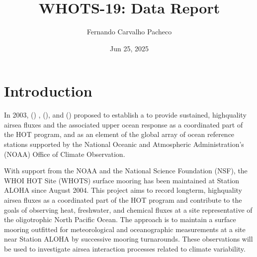 \documentclass[a4paper,10pt,english,openany,oneside]{sphinxmanual}
\title{WHOTS-19: Data Report}
\date{Jun 25, 2025}
\author{Fernando Carvalho Pacheco}
\begin{document}
\pagestyle{empty}
 
        
    
\pagestyle{plain}
 
\pagestyle{normal}
\label{\detokenize{index::doc}}



\chapter{Introduction}
\label{\detokenize{1_section:introduction}}\label{\detokenize{1_section::doc}}
\sphinxAtStartPar
In 2003,  ()
, 
(), and
() proposed to establish
a 
to provide sustained, high\sphinxhyphen{}quality air\sphinxhyphen{}sea fluxes and the associated upper
ocean response as a coordinated part of the HOT program, and as an element of
the global array of ocean reference stations supported by the National Oceanic
and Atmospheric Administration’s (NOAA) Office of Climate Observation.

\sphinxAtStartPar
With support from the NOAA and the National Science Foundation (NSF), the WHOI
HOT Site (WHOTS) surface mooring has been maintained at Station ALOHA since
August 2004. This project aims to record long\sphinxhyphen{}term, high\sphinxhyphen{}quality air\sphinxhyphen{}sea fluxes
as a coordinated part of the HOT program and contribute to the goals of
observing heat, freshwater, and chemical fluxes at a site representative of the
oligotrophic North Pacific Ocean. The approach is to maintain a surface mooring
outfitted for meteorological and oceanographic measurements at a site near
Station ALOHA by successive mooring turnarounds. These observations will be
used to investigate air\sphinxhyphen{}sea interaction processes related to climate
variability.
\end{document}
